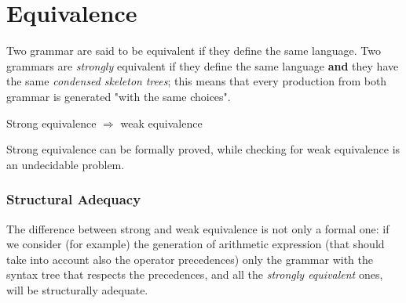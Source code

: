 	\section{Equivalence}
		Two grammar are said to be equivalent if they define the same language. Two grammars are \emph{strongly} equivalent if they define the same language 
		\textbf{and} they have the same \emph{condensed} \emph{skeleton} \emph{trees}; this means that every production from both grammar is generated 
		"with the same choices".

		Strong equivalence $\Rightarrow$ weak equivalence

		Strong equivalence can be formally proved, while checking for weak equivalence is an undecidable problem.

		\subsubsection{Structural Adequacy}
			The difference between strong and weak equivalence is not only a formal one: if we consider (for example) the generation of arithmetic expression 
			(that should take into account also the operator precedences) only the grammar with the syntax tree that respects the precedences, and all the 
			\emph{strongly equivalent} ones, will be structurally adequate.

